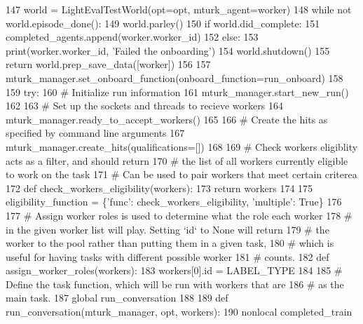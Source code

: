 \begin{DoxyCode}
147             world = LightEvalTestWorld(opt=opt, mturk\_agent=worker)
148             \textcolor{keywordflow}{while} \textcolor{keywordflow}{not} world.episode\_done():
149                 world.parley()
150             \textcolor{keywordflow}{if} world.did\_complete:
151                 completed\_agents.append(worker.worker\_id)
152             \textcolor{keywordflow}{else}:
153                 print(worker.worker\_id, \textcolor{stringliteral}{'Failed the onboarding'})
154             world.shutdown()
155             \textcolor{keywordflow}{return} world.prep\_save\_data([worker])
156 
157     mturk\_manager.set\_onboard\_function(onboard\_function=run\_onboard)
158 
159     \textcolor{keywordflow}{try}:
160         \textcolor{comment}{# Initialize run information}
161         mturk\_manager.start\_new\_run()
162 
163         \textcolor{comment}{# Set up the sockets and threads to recieve workers}
164         mturk\_manager.ready\_to\_accept\_workers()
165 
166         \textcolor{comment}{# Create the hits as specified by command line arguments}
167         mturk\_manager.create\_hits(qualifications=[])
168 
169         \textcolor{comment}{# Check workers eligiblity acts as a filter, and should return}
170         \textcolor{comment}{# the list of all workers currently eligible to work on the task}
171         \textcolor{comment}{# Can be used to pair workers that meet certain criterea}
172         \textcolor{keyword}{def }check\_workers\_eligibility(workers):
173             \textcolor{keywordflow}{return} workers
174 
175         eligibility\_function = \{\textcolor{stringliteral}{'func'}: check\_workers\_eligibility, \textcolor{stringliteral}{'multiple'}: \textcolor{keyword}{True}\}
176 
177         \textcolor{comment}{# Assign worker roles is used to determine what the role each worker}
178         \textcolor{comment}{# in the given worker list will play. Setting `id` to None will return}
179         \textcolor{comment}{# the worker to the pool rather than putting them in a given task,}
180         \textcolor{comment}{# which is useful for having tasks with different possible worker}
181         \textcolor{comment}{# counts.}
182         \textcolor{keyword}{def }assign\_worker\_roles(workers):
183             workers[0].id = LABEL\_TYPE
184 
185         \textcolor{comment}{# Define the task function, which will be run with workers that are}
186         \textcolor{comment}{# as the main task.}
187         \textcolor{keyword}{global} run\_conversation
188 
189         \textcolor{keyword}{def }run\_conversation(mturk\_manager, opt, workers):
190             nonlocal completed\_train

\end{DoxyCode}

